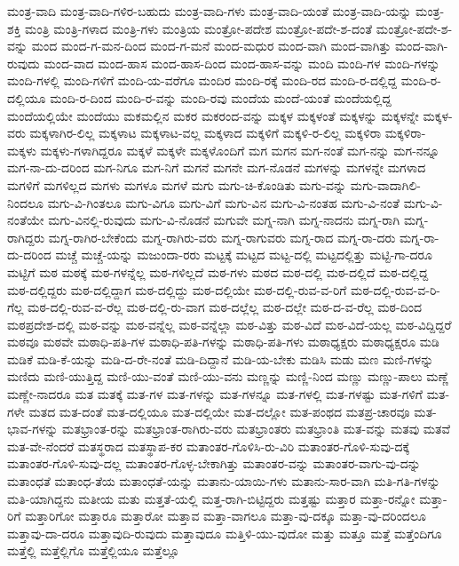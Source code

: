 {ಮಂತ್ರ-ವಾದಿ
ಮಂತ್ರ-ವಾದಿ-ಗಳಿರ-ಬಹುದು
ಮಂತ್ರ-ವಾದಿ-ಗಳು
ಮಂತ್ರ-ವಾದಿ-ಯಂತೆ
ಮಂತ್ರ-ವಾದಿ-ಯನ್ನು
ಮಂತ್ರ-ಶಕ್ತಿ
ಮಂತ್ರಿ
ಮಂತ್ರಿ-ಗಳಾದ
ಮಂತ್ರಿ-ಗಳು
ಮಂತ್ರಿಯ
ಮಂತ್ರೋ-ಪದೇಶ
ಮಂತ್ರೋ-ಪದೇ-ಶ-ದಂತೆ
ಮಂತ್ರೋ-ಪದೇ-ಶ-ವನ್ನು
ಮಂದ
ಮಂದ-ಗ-ಮನ-ದಿಂದ
ಮಂದ-ಗ-ಮನೆ
ಮಂದ-ಮಧುರ
ಮಂದ-ವಾಗಿ
ಮಂದ-ವಾಗಿತ್ತು
ಮಂದ-ವಾಗಿ-ರುವುದು
ಮಂದ-ವಾದ
ಮಂದ-ಹಾಸ
ಮಂದ-ಹಾಸ-ದಿಂದ
ಮಂದ-ಹಾಸ-ವನ್ನು
ಮಂದಿ
ಮಂದಿ-ಗಳ
ಮಂದಿ-ಗಳನ್ನು
ಮಂದಿ-ಗಳಲ್ಲಿ
ಮಂದಿ-ಗಳಿಗೆ
ಮಂದಿ-ಯ-ವರೆಗೂ
ಮಂದಿರ
ಮಂದಿ-ರಕ್ಕೆ
ಮಂದಿ-ರದ
ಮಂದಿ-ರ-ದಲ್ಲಿದ್ದ
ಮಂದಿ-ರ-ದಲ್ಲಿಯೂ
ಮಂದಿ-ರ-ದಿಂದ
ಮಂದಿ-ರ-ವನ್ನು
ಮಂದಿ-ರವು
ಮಂದೆಯ
ಮಂದೆ-ಯಂತೆ
ಮಂದೆಯಲ್ಲಿದ್ದ
ಮಂದೆಯಲ್ಲಿಯೇ
ಮಂದೆಯು
ಮಕಮಲ್ಲಿನ
ಮಕರ
ಮಕರಂದ-ವನ್ನು
ಮಕ್ಕಳ
ಮಕ್ಕಳಂತೆ
ಮಕ್ಕಳನ್ನು
ಮಕ್ಕಳನ್ನೇ
ಮಕ್ಕಳ-ವರು
ಮಕ್ಕಳಾಗಿರ-ಲಿಲ್ಲ
ಮಕ್ಕಳಾಟ
ಮಕ್ಕಳಾಟ-ವಲ್ಲ
ಮಕ್ಕಳಾದ
ಮಕ್ಕಳಿಗೆ
ಮಕ್ಕಳಿ-ರ-ಲಿಲ್ಲ
ಮಕ್ಕಳಿರಾ
ಮಕ್ಕಳಿರಾ-
ಮಕ್ಕಳು
ಮಕ್ಕಳು-ಗಳಾಗಿದ್ದರೂ
ಮಕ್ಕಳೆ
ಮಕ್ಕಳೇ
ಮಕ್ಕಳೊಂದಿಗೆ
ಮಗ
ಮಗನ
ಮಗ-ನಂತೆ
ಮಗ-ನನ್ನು
ಮಗ-ನನ್ನೂ
ಮಗ-ನಾ-ದು-ದರಿಂದ
ಮಗ-ನಿಗೂ
ಮಗ-ನಿಗೆ
ಮಗನೆ
ಮಗನೇ
ಮಗ-ನೊಡನೆ
ಮಗಳನ್ನು
ಮಗಳನ್ನೇ
ಮಗಳಾದ
ಮಗಳಿಗೆ
ಮಗಳಿಲ್ಲದ
ಮಗಳು
ಮಗಳೂ
ಮಗಳೆ
ಮಗು
ಮಗು-ಚಿ-ಕೊಂಡಿತು
ಮಗು-ವನ್ನು
ಮಗು-ವಾದಾಗಿಲಿ-ನಿಂದಲೂ
ಮಗು-ವಿ-ಗಿಂತಲೂ
ಮಗು-ವಿಗೂ
ಮಗು-ವಿಗೆ
ಮಗು-ವಿನ
ಮಗು-ವಿ-ನಂತಹ
ಮಗು-ವಿ-ನಂತೆ
ಮಗು-ವಿ-ನಂತೆಯೇ
ಮಗು-ವಿನಲ್ಲಿ-ರುವುದು
ಮಗು-ವಿ-ನೊಡನೆ
ಮಗುವೇ
ಮಗ್ನ-ನಾಗಿ
ಮಗ್ನ-ನಾದನು
ಮಗ್ನ-ರಾಗಿ
ಮಗ್ನ-ರಾಗಿದ್ದರು
ಮಗ್ನ-ರಾಗಿರ-ಬೇಕೆಂದು
ಮಗ್ನ-ರಾಗಿರು-ವರು
ಮಗ್ನ-ರಾಗುವರು
ಮಗ್ನ-ರಾದ
ಮಗ್ನ-ರಾ-ದರು
ಮಗ್ನ-ರಾ-ದು-ದರಿಂದ
ಮಚ್ಚೆ
ಮಚ್ಚೆ-ಯನ್ನು
ಮಜುಂದಾ-ರರು
ಮಟ್ಟಕ್ಕೆ
ಮಟ್ಟದ
ಮಟ್ಟ-ದಲ್ಲಿ
ಮಟ್ಟದಲ್ಲಿತ್ತು
ಮಟ್ಟಿ-ಗಾ-ದರೂ
ಮಟ್ಟಿಗೆ
ಮಠ
ಮಠಕ್ಕೆ
ಮಠ-ಗಳನ್ನೆಲ್ಲ
ಮಠ-ಗಳಿಲ್ಲದೆ
ಮಠ-ಗಳು
ಮಠದ
ಮಠ-ದಲ್ಲಿ
ಮಠ-ದಲ್ಲಿದೆ
ಮಠ-ದಲ್ಲಿದ್ದ
ಮಠ-ದಲ್ಲಿದ್ದರು
ಮಠ-ದಲ್ಲಿದ್ದಾಗ
ಮಠ-ದಲ್ಲಿದ್ದು
ಮಠ-ದಲ್ಲಿಯೇ
ಮಠ-ದಲ್ಲಿ-ರುವ-ವ-ರಿಗೆ
ಮಠ-ದಲ್ಲಿ-ರುವ-ವ-ರಿ-ಗೆಲ್ಲ
ಮಠ-ದಲ್ಲಿ-ರುವ-ವ-ರೆಲ್ಲ
ಮಠ-ದಲ್ಲಿ-ರು-ವಾಗ
ಮಠ-ದಲ್ಲೆಲ್ಲ
ಮಠ-ದಲ್ಲೇ
ಮಠ-ದ-ವ-ರೆಲ್ಲ
ಮಠ-ದಿಂದ
ಮಠಪ್ರದೇಶ-ದಲ್ಲಿ
ಮಠ-ವನ್ನು
ಮಠ-ವನ್ನೆಲ್ಲ
ಮಠ-ವನ್ನೆಲ್ಲಾ
ಮಠ-ವಿತ್ತು
ಮಠ-ವಿದೆ
ಮಠ-ವಿದೆ-ಯಲ್ಲ
ಮಠ-ವಿದ್ದಿದ್ದರೆ
ಮಠವೂ
ಮಠವೇ
ಮಠಾಧಿ-ಪತಿ-ಗಳ
ಮಠಾಧಿ-ಪತಿ-ಗಳನ್ನು
ಮಠಾಧಿ-ಪತಿ-ಗಳು
ಮಠಾಧ್ಯಕ್ಷರು
ಮಠಾಧ್ಯಕ್ಷರೂ
ಮಡಿ
ಮಡಿಕೆ
ಮಡಿ-ಕೆ-ಯನ್ನು
ಮಡಿ-ದ-ರೇ-ನಂತೆ
ಮಡಿ-ದಿದ್ದಾನೆ
ಮಡಿ-ಯ-ಬೇಕು
ಮಡಿಸಿ
ಮಡು
ಮಣ
ಮಣಿ-ಗಳನ್ನು
ಮಣಿದು
ಮಣಿ-ಯುತ್ತಿದ್ದ
ಮಣಿ-ಯು-ವಂತೆ
ಮಣಿ-ಯು-ವನು
ಮಣ್ಣನ್ನು
ಮಣ್ಣಿ-ನಿಂದ
ಮಣ್ಣು
ಮಣ್ಣು-ಪಾಲು
ಮಣ್ಣೆ
ಮಣ್ಣೇ-ನಾದರೂ
ಮತ
ಮತಕ್ಕೆ
ಮತ-ಗಳ
ಮತ-ಗಳನ್ನು
ಮತ-ಗಳನ್ನೂ
ಮತ-ಗಳಲ್ಲಿ
ಮತ-ಗಳಷ್ಟು
ಮತ-ಗಳಿಗೆ
ಮತ-ಗಳೇ
ಮತದ
ಮತ-ದಂತೆ
ಮತ-ದಲ್ಲಿಯೂ
ಮತ-ದಲ್ಲಿಯೇ
ಮತ-ದಲ್ಲೋ
ಮತ-ಪಂಥದ
ಮತಪ್ರ-ಚಾರವೂ
ಮತ-ಭಾವ-ಗಳನ್ನು
ಮತಭ್ರಾಂತ-ರನ್ನು
ಮತಭ್ರಾಂತ-ರಾಗಿರು-ವರು
ಮತಭ್ರಾಂತರು
ಮತಭ್ರಾಂತಿ
ಮತ-ವನ್ನು
ಮತವು
ಮತವೆ
ಮತ-ವೇ-ನೆಂದರೆ
ಮತಸ್ಥರಾದ
ಮತಸ್ಥಾಪ-ಕರ
ಮತಾಂತರ-ಗೊಳಿಸಿ-ರು-ವಿರಿ
ಮತಾಂತರ-ಗೊಳಿ-ಸುವು-ದಕ್ಕೆ
ಮತಾಂತರ-ಗೊಳಿ-ಸುವು-ದಲ್ಲ
ಮತಾಂತರ-ಗೊಳ್ಳ-ಬೇಕಾಗಿತ್ತು
ಮತಾಂತರ-ವನ್ನು
ಮತಾಂತರ-ವಾಗು-ವು-ದನ್ನು
ಮತಾಂಧತೆ
ಮತಾಂಧ-ತೆಯ
ಮತಾಂಧತೆ-ಯನ್ನು
ಮತಾನು-ಯಾಯಿ-ಗಳು
ಮತಾನು-ಸಾರ-ವಾಗಿ
ಮತಿ-ಗತಿ-ಗಳನ್ನು
ಮತಿ-ಯಾಗಿದ್ದನು
ಮತೀಯ
ಮತು
ಮತ್ತತೆ-ಯಲ್ಲಿ
ಮತ್ತ-ರಾಗಿ-ಬಿಟ್ಟಿದ್ದರು
ಮತ್ತಷ್ಟು
ಮತ್ತಾರ
ಮತ್ತಾ-ರನ್ನೋ
ಮತ್ತಾ-ರಿಗೆ
ಮತ್ತಾರಿಗೋ
ಮತ್ತಾರೂ
ಮತ್ತಾರೋ
ಮತ್ತಾವ
ಮತ್ತಾ-ವಾಗಲೂ
ಮತ್ತಾ-ವು-ದಕ್ಕೂ
ಮತ್ತಾ-ವು-ದರಿಂದಲೂ
ಮತ್ತಾವು-ದಾ-ದರೂ
ಮತ್ತಾವುದಿ-ರುವುದು
ಮತ್ತಾವುದೂ
ಮತ್ತಿಳಿ-ಯು-ವುದೋ
ಮತ್ತು
ಮತ್ತೂ
ಮತ್ತೆ
ಮತ್ತೆಂದಿಗೂ
ಮತ್ತೆಲ್ಲಿ
ಮತ್ತೆಲ್ಲಿಗೊ
ಮತ್ತೆಲ್ಲಿಯೂ
ಮತ್ತೆಲ್ಲೂ
}
